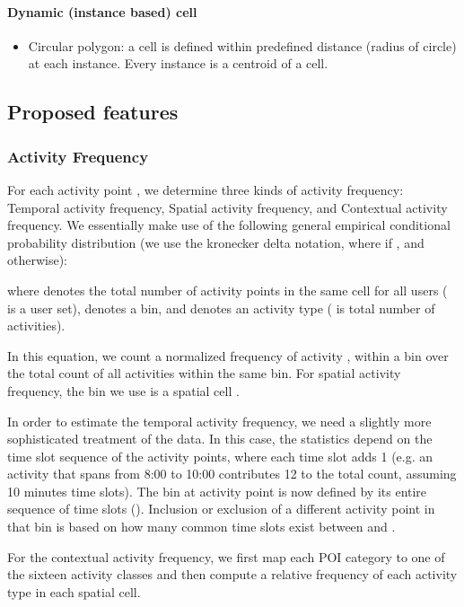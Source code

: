 \documentclass{sig-alternate}
\begin{document}
\paragraph{Dynamic (instance based) cell}
\begin{itemize}
\item Circular polygon: a cell is defined within predefined distance (radius of circle) at each instance. Every instance is a centroid of a cell.
\end{itemize}


 \subsection{Proposed features}



\subsubsection{Activity Frequency}

For each activity point , we determine three kinds of activity frequency: Temporal activity frequency, Spatial activity frequency, and Contextual activity frequency. We essentially make use of the following general empirical conditional probability distribution (we use the kronecker delta notation, where  if , and  otherwise):



 where  denotes the total number of activity points in the same cell for all users  ( is a user set),  denotes a bin, and  denotes an activity type ( is total number of activities).

\noindent In this equation, we count a normalized frequency of activity , within a bin over the total count of all activities within the same bin. For spatial activity frequency, the bin we use is a spatial cell .


In order to estimate the temporal activity frequency, we need a slightly more sophisticated treatment of the data. In this case, the statistics depend on the time slot sequence of the activity points, where each time slot adds 1 (e.g. an activity that spans from 8:00 to 10:00 contributes 12 to the total count, assuming 10 minutes time slots). The bin at activity point  is now defined by its entire sequence of time slots (). Inclusion or exclusion of a different activity point  in that bin is based on how many common time slots exist between  and .

For the contextual activity frequency, we first map each POI category to one of the sixteen activity classes and then compute a relative frequency of each activity type in each spatial cell.
\end{document}
